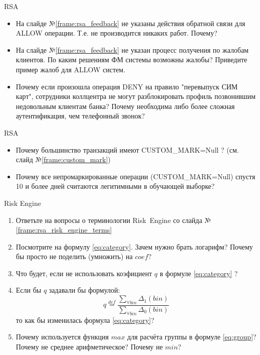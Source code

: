 \begin{frame}{RSA}
	\begin{itemize}
		\item На слайде №\ref{frame:rsa_feedback} не указаны действия
		обратной связи для ALLOW операции. Т.е. не производится никаких работ. 
		Почему?
		\item На слайде №\ref{frame:rsa_feedback} не указан процесс получения 
		по жалобам клиентов. По каким решениям ФМ системы возможны жалобы? 
		Приведите пример жалоб для ALLOW систем. 
		\item Почему если произошла операция DENY на правило "перевыпуск СИМ карт", 
		сотрудники коллцентра не могут разблокировать профиль позвонившим
		недовольным клиентам банка? Почему необходима либо более сложная аутентификация, чем 
		телефонный звонок?
	\end{itemize}
\end{frame}

\begin{frame}{RSA}
\begin{itemize}
	\item Почему большинство транзакций имеют CUSTOM\_MARK=Null ?
	(см. слайд №\ref{frame:custom_mark})
	\item Почему все непромаркированные операции (CUSTOM\_MARK=Null) спустя 10 и более дней считаются 
	легитимными в обучающей выборке?
\end{itemize}
\end{frame}

\begin{frame}{Risk Engine}
	\small
	\begin{enumerate}
		\item 	Ответьте на вопросы о терминологии \mbox{Risk Engine}
		со слайда №\ref{frame:rsa_risk_engine_terms}
		\item Посмотрите на формулу \eqref{eq:category}. Зачем нужно брать логарифм?
		Почему бы просто не поделить (умножить) на $coef$?  
		\item Что будет, если не использовать коэфициент $q$ в формуле \eqref{eq:category} ?
		\item Если бы $q$ задавали бы формулой:
		\begin{equation*}
		q \stackrel{def}{=} \frac{\sum_{\forall bin} \Delta_1(bin)}{\sum_{\forall bin} \Delta_0(bin)}
		\end{equation*}
		то как бы изменилась формула \eqref{eq:category}?
		\item Почему используется функция $max$ для расчёта группы в формуле \eqref{eq:group}?
		Почему не среднее арифметическое? Почему не $min$?
		
		
	\end{enumerate}
\end{frame}

